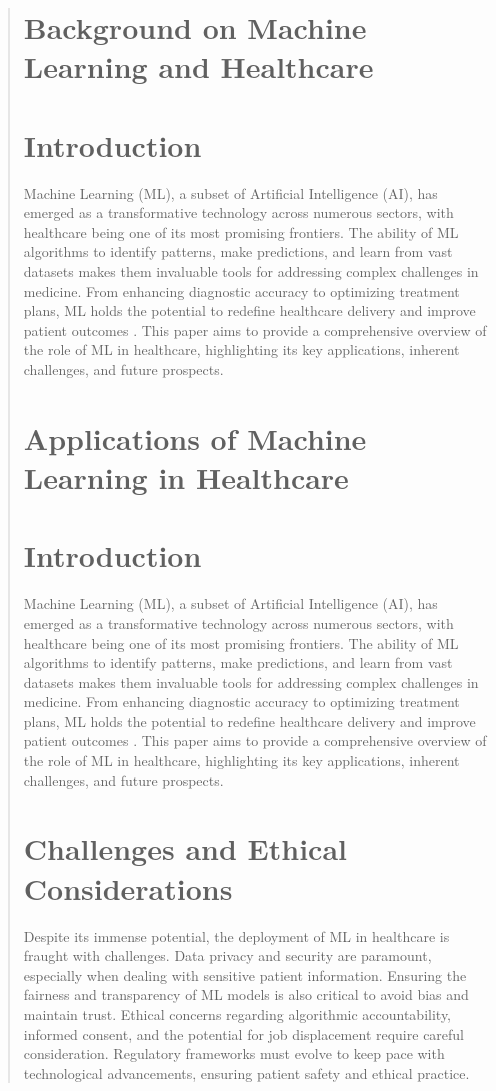 \documentclass[11pt,a4paper]{article}
\begin{document}
\begin{abstract}
\section{Background on Machine Learning and Healthcare}

\section{Introduction}
Machine Learning (ML), a subset of Artificial Intelligence (AI), has emerged as a transformative technology across numerous sectors, with healthcare being one of its most promising frontiers. The ability of ML algorithms to identify patterns, make predictions, and learn from vast datasets makes them invaluable tools for addressing complex challenges in medicine. From enhancing diagnostic accuracy to optimizing treatment plans, ML holds the potential to redefine healthcare delivery and improve patient outcomes \cite{Smith2020}. This paper aims to provide a comprehensive overview of the role of ML in healthcare, highlighting its key applications, inherent challenges, and future prospects.

\section{Applications of Machine Learning in Healthcare}

\section{Introduction}
Machine Learning (ML), a subset of Artificial Intelligence (AI), has emerged as a transformative technology across numerous sectors, with healthcare being one of its most promising frontiers. The ability of ML algorithms to identify patterns, make predictions, and learn from vast datasets makes them invaluable tools for addressing complex challenges in medicine. From enhancing diagnostic accuracy to optimizing treatment plans, ML holds the potential to redefine healthcare delivery and improve patient outcomes \cite{Smith2020}. This paper aims to provide a comprehensive overview of the role of ML in healthcare, highlighting its key applications, inherent challenges, and future prospects.

\section{Challenges and Ethical Considerations}
Despite its immense potential, the deployment of ML in healthcare is fraught with challenges. Data privacy and security are paramount, especially when dealing with sensitive patient information. Ensuring the fairness and transparency of ML models is also critical to avoid bias and maintain trust. Ethical concerns regarding algorithmic accountability, informed consent, and the potential for job displacement require careful consideration. Regulatory frameworks must evolve to keep pace with technological advancements, ensuring patient safety and ethical practice.


\end{abstract}
\end{document}
